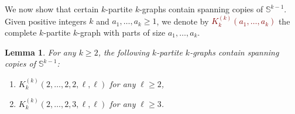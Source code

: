 \documentclass[12pt,reqno]{amsart}
\theoremstyle{plain}
\newtheorem{lemma}[theorem]{Lemma}
\theoremstyle{definition}
\numberwithin{equation}{section}
\renewcommand{\ge}{\geqslant}
\renewcommand{\geq}{\geqslant}
\newcommand{\defn}[1]{\textcolor{Maroon}{\emph{#1}}}
\newcommand{\bS}{\mathbb{S}}
\begin{document}
	We now show that certain $k$-partite $k$-graphs contain spanning copies of $\bS^{k - 1}$.
	Given positive integers $k$ and $a_1, \dotsc, a_k \ge 1$, we denote by \defn{$K_k^{(k)}(a_1, \dotsc, a_k)$} the complete $k$-partite $k$-graph with parts of size $a_1, \dotsc, a_k$.
	
	\begin{lemma}\label{lem:partitesphere}
		For any $k \geq 2$, the following $k$-partite $k$-graphs contain spanning copies of $\bS^{k - 1}$\textup{:}
		\begin{enumerate}[label = \textup{(}\alph*\textup{)}]
			\item \label{itm:partitesphere-a} $K_k^{(k)}(2, \dotsc, 2, 2, \ell, \ell)$ for any $\ell \geq 2$,
			\item \label{itm:partitesphere-b} $K_k^{(k)}(2, \dotsc, 2, 3, \ell, \ell)$ for any $\ell \geq 3$.
		\end{enumerate}
	\end{lemma}
	
\end{document}
